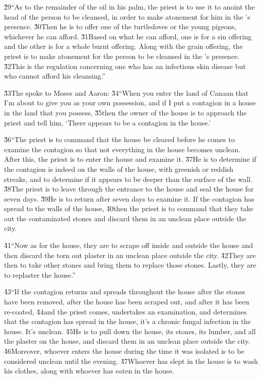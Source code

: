 \v{29}``As to the remainder of the oil in his palm, the priest is to use it to anoint the head of the person to be cleansed, in order to make atonement for him in the 's presence. \v{30}Then he is to offer one of the turtledoves or the young pigeons, whichever he can afford. \v{31}Based on what he can afford, one is for a sin offering and the other is for a whole burnt offering. Along with the grain offering, the priest is to make atonement for the person to be cleansed in the 's presence. \v{32}This is the regulation concerning one who has an infectious skin disease but who cannot afford his cleansing.''

\v{33}The  spoke to Moses and Aaron: \v{34}``When you enter the land of Canaan that I'm about to give you as your own possession, and if I put a contagion in a house in the land that you possess, \v{35}then the owner of the house is to approach the priest and tell him, `There appears to be a contagion in the house.'

\v{36}``The priest is to command that the house be cleared before he comes to examine the contagion so that not everything in the house becomes unclean. After this, the priest is to enter the house and examine it. \v{37}He is to determine if the contagion is indeed on the walls of the house, with greenish or reddish streaks, and to determine if it appears to be deeper than the surface of the wall. \v{38}The priest is to leave through the entrance to the house and seal the house for seven days. \v{39}He is to return after seven days to examine it. If the contagion has spread to the walls of the house, \v{40}then the priest is to command that they take out the contaminated stones and discard them in an unclean place outside the city.

\v{41}``Now as for the house, they are to scrape off inside and outside the house and then discard the torn out plaster in an unclean place outside the city. \v{42}They are then to take other stones and bring them to replace those stones. Lastly, they are to replaster the house.''

\v{43}``If the contagion returns and spreads throughout the house after the stones have been removed, after the house has been scraped out, and after it has been re-coated, \v{44}and the priest comes, undertakes an examination, and determines that the contagion has spread in the house, it's a chronic fungal infection in the house. It's unclean. \v{45}He is to pull down the house, its stones, its lumber, and all the plaster on the house, and discard them in an unclean place outside the city. \v{46}Moreover, whoever enters the house during the time it was isolated is to be considered unclean until the evening. \v{47}Whoever has slept in the house is to wash his clothes, along with whoever has eaten in the house.

